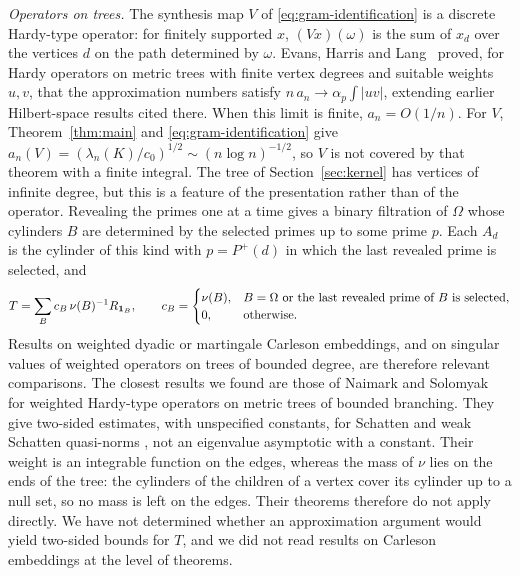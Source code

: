 \emph{Operators on trees.} The synthesis map $V$ of
\eqref{eq:gram-identification} is a discrete Hardy-type operator: for
finitely supported $x$, $(Vx)(\omega)$ is the sum of $x_d$ over the
vertices $d$ on the path determined by $\omega$. Evans, Harris and
Lang~\cite{EHL} proved, for Hardy operators on metric trees with finite
vertex degrees and suitable weights $u,v$, that the approximation numbers
satisfy $n\,a_n\to\alpha_p\int|uv|$, extending earlier Hilbert-space
results cited there. When this limit is finite,
$a_n=O(1/n)$. For $V$, Theorem~\ref{thm:main} and
\eqref{eq:gram-identification} give
$a_n(V)=(\lambda_n(K)/c_0)^{1/2}\sim(n\log n)^{-1/2}$, so $V$ is not covered
by that theorem with a finite integral. The tree of
Section~\ref{sec:kernel} has vertices of infinite degree, but this is a
feature of the presentation rather than of the operator. Revealing the
primes one at a time gives a binary filtration of $\Omega$ whose cylinders
$B$ are determined by the selected primes up to some prime $p$. Each $A_d$
is the cylinder of this kind with $p=P^+(d)$ in which the last revealed
prime is selected, and
\[
 T=\sum_B c_B\,\nu(B)^{-1}R_{\mathbf 1_B},
 \qquad
 c_B=\begin{cases}\nu(B),&B=\Omega\text{ or the last revealed prime of }B
 \text{ is selected},\\0,&\text{otherwise}.\end{cases}
\]
Results on weighted dyadic or martingale Carleson embeddings, and on
singular values of weighted operators on trees of bounded degree, are
therefore relevant comparisons. The closest results we found are those of
Naimark and Solomyak~\cite{NS} for weighted Hardy-type operators on metric
trees of bounded branching. They give two-sided estimates, with
unspecified constants, for Schatten and weak Schatten quasi-norms
\cite[Theorems~4.1 and~4.6, Corollary~4.7]{NS}, not an eigenvalue
asymptotic with a constant. Their weight is an integrable function on the
edges, whereas the mass of $\nu$ lies on the ends of the tree: the
cylinders of the children of a vertex cover its cylinder up to a null set,
so no mass is left on the edges. Their theorems therefore do not apply
directly. We have not determined whether an approximation argument would
yield two-sided bounds for $T$, and we did not read results on Carleson
embeddings at the level of theorems.

